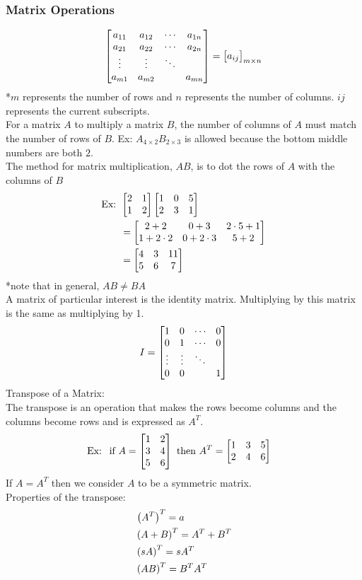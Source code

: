\documentclass[11pt, fleqn]{article}
\begin{document}
\subsubsection{Matrix Operations}
$$\matrixx{a_{11}&a_{12}&\cdots&a_{1n}\\a_{21}&a_{22}&\cdots&a_{2n}\\\vdots&\vdots&\ddots& \\a_{m1}&a_{m2}& &a_{mn}}=\matrixx{a_{ij}}_{m\times n}$$
*$m$ represents the number of rows and $n$ represents the number of columns. $ij$ represents the current subscripts.\\
For a matrix $A$ to multiply a matrix $B$, the number of columns of $A$ must match the number of rows of $B$. Ex: $A_{4\times2}B_{2\times3}$ is allowed because the bottom middle numbers are both $2$.\\
The method for matrix multiplication, $AB$, is to dot the rows of $A$ with the columns of $B$
\begin{align*}
    \text{Ex: }&\matrixx{2&1\\1&2}\matrixx{1&0&5\\2&3&1}\\
    &=\matrixx{2+2&0+3&2\cdot5+1\\1+2\cdot2&0+2\cdot3&5+2}\\
    &=\matrixx{4&3&11\\5&6&7}
\end{align*}
*note that in general, $AB\neq BA$\\
A matrix of particular interest is the identity matrix. Multiplying by this matrix is the same as multiplying by 1.
$$I=\matrixx{1&0&\cdots&0\\0&1&\cdots&0\\\vdots&\vdots&\ddots& \\0&0& &1}$$
Transpose of a Matrix:\\
The transpose is an operation that makes the rows become columns and the columns become rows and is expressed as $A^T$.
\begin{align*}
    \text{Ex: }&\text{ if }A=\matrixx{1&2\\3&4\\5&6}\text{ then }A^T=\matrixx{1&3&5\\2&4&6}
\end{align*}
If $A=A^T$ then we consider $A$ to be a symmetric matrix.\\
Properties of the transpose:
\begin{align*}
    &\left( A^T \right)^T=a\\
    &\left( A+B \right)^T=A^T+B^T\\
    &\left( sA \right)^T=sA^T\\
    &\left( AB \right)^T=B^TA^T
\end{align*}
\end{document}
